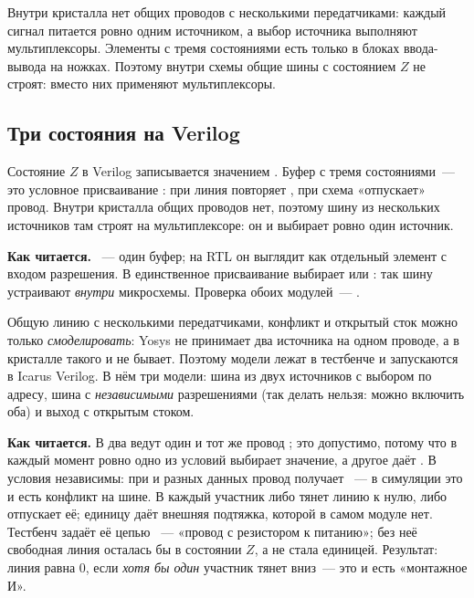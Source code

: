 \begin{infobox}
Внутри кристалла нет общих проводов с несколькими передатчиками: каждый
сигнал питается ровно одним источником, а выбор источника выполняют
мультиплексоры. Элементы с тремя состояниями есть только в блоках ввода-вывода
на ножках. Поэтому внутри схемы общие шины с состоянием $Z$ не строят:
вместо них применяют мультиплексоры.
\end{infobox}

\subsection{Три состояния на Verilog}

Состояние $Z$ в Verilog записывается значением . Буфер с тремя
состояниями~--- это условное присваивание
: при  линия повторяет
, при  схема «отпускает» провод. Внутри кристалла общих
проводов нет, поэтому шину из нескольких источников там строят на
мультиплексоре: он и выбирает ровно один источник.


\textbf{Как читается.} ~--- один буфер; на RTL он выглядит как
отдельный элемент с входом разрешения. В  единственное
присваивание выбирает  или : так шину устраивают
\emph{внутри} микросхемы. Проверка обоих модулей~--- .

Общую линию с несколькими передатчиками, конфликт и открытый сток можно только
\emph{смоделировать}: Yosys не принимает два источника на одном проводе, а в
кристалле такого и не бывает. Поэтому модели лежат в тестбенче
 и запускаются в Icarus Verilog. В нём три модели: шина из двух
источников с выбором по адресу, шина с \emph{независимыми} разрешениями (так
делать нельзя: можно включить оба) и выход с открытым стоком.


\textbf{Как читается.} В  два  ведут один и тот же
провод ; это допустимо, потому что в каждый момент ровно одно из
условий выбирает значение, а другое даёт . В 
условия независимы: при  и разных данных провод
получает ~--- в симуляции это и есть конфликт на шине. В
 каждый участник либо тянет линию к нулю, либо отпускает
её; единицу даёт внешняя подтяжка, которой в самом модуле нет. Тестбенч
задаёт её цепью ~--- «провод с резистором к питанию»; без неё
свободная линия осталась бы в состоянии $Z$, а не стала единицей. Результат:
линия равна 0, если \emph{хотя бы один} участник тянет вниз~--- это и есть
«монтажное И».

